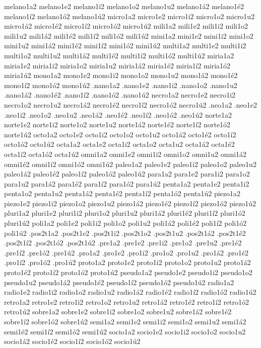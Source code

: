 {melano1a2 melano1e2 melano1i2 melano1o2 melano1u2 melano1á2 melano1é2 melano1í2 melano1ó2 melano1ú2 
micro1a2 micro1e2 micro1i2 micro1o2 micro1u2 micro1á2 micro1é2 micro1í2 micro1ó2 micro1ú2 
mili1a2 mili1e2 mili1i2 mili1o2 mili1u2 mili1á2 mili1é2 mili1í2 mili1ó2 mili1ú2 
mini1a2 mini1e2 mini1i2 mini1o2 mini1u2 mini1á2 mini1é2 mini1í2 mini1ó2 mini1ú2 
multi1a2 multi1e2 multi1i2 multi1o2 multi1u2 multi1á2 multi1é2 multi1í2 multi1ó2 multi1ú2 
miria1a2 miria1e2 miria1i2 miria1o2 miria1u2 miria1á2 miria1é2 miria1í2 miria1ó2 miria1ú2 
mono1a2 mono1e2 mono1i2 mono1o2 mono1u2 mono1á2 mono1é2 mono1í2 mono1ó2 mono1ú2 
.nano1a2 .nano1e2 .nano1i2 .nano1o2 .nano1u2 .nano1á2 .nano1é2 .nano1í2 .nano1ó2 .nano1ú2 
necro1a2 necro1e2 necro1i2 necro1o2 necro1u2 necro1á2 necro1é2 necro1í2 necro1ó2 necro1ú2 
.neo1a2 .neo1e2 .neo1i2 .neo1o2 .neo1u2 .neo1á2 .neo1é2 .neo1í2 .neo1ó2 .neo1ú2 
norte1a2 norte1e2 norte1i2 norte1o2 norte1u2 norte1á2 norte1é2 norte1í2 norte1ó2 norte1ú2 
octo1a2 octo1e2 octo1i2 octo1o2 octo1u2 octo1á2 octo1é2 octo1í2 octo1ó2 octo1ú2 
octa1a2 octa1e2 octa1i2 octa1o2 octa1u2 octa1á2 octa1é2 octa1í2 octa1ó2 octa1ú2 
omni1a2 omni1e2 omni1i2 omni1o2 omni1u2 omni1á2 omni1é2 omni1í2 omni1ó2 omni1ú2 
paleo1a2 paleo1e2 paleo1i2 paleo1o2 paleo1u2 paleo1á2 paleo1é2 paleo1í2 paleo1ó2 paleo1ú2 
para1a2 para1e2 para1i2 para1o2 para1u2 para1á2 para1é2 para1í2 para1ó2 para1ú2 
penta1a2 penta1e2 penta1i2 penta1o2 penta1u2 penta1á2 penta1é2 penta1í2 penta1ó2 penta1ú2 
piezo1a2 piezo1e2 piezo1i2 piezo1o2 piezo1u2 piezo1á2 piezo1é2 piezo1í2 piezo1ó2 piezo1ú2 
pluri1a2 pluri1e2 pluri1i2 pluri1o2 pluri1u2 pluri1á2 pluri1é2 pluri1í2 pluri1ó2 pluri1ú2 
poli1a2 poli1e2 poli1i2 poli1o2 poli1u2 poli1á2 poli1é2 poli1í2 poli1ó2 poli1ú2 
.pos2t1a2 .pos2t1e2 .pos2t1i2 .pos2t1o2 .pos2t1u2 .pos2t1á2 .pos2t1é2 .pos2t1í2 .pos2t1ó2 .pos2t1ú2 
.pre1a2 .pre1e2 .pre1i2 .pre1o2 .pre1u2         .pre1é2 .pre1í2 .pre1ó2 .pre1ú2 
.pro1a2 .pro1e2 .pro1i2 .pro1o2 .pro1u2 .pro1á2 .pro1é2 .pro1í2 .pro1ó2 .pro1ú2 
proto1a2 proto1e2 proto1i2 proto1o2 proto1u2 proto1á2 proto1é2 proto1í2 proto1ó2 proto1ú2 
pseudo1a2 pseudo1e2 pseudo1i2 pseudo1o2 pseudo1u2 pseudo1á2 pseudo1é2 pseudo1í2 pseudo1ó2 pseudo1ú2 
radio1a2 radio1e2 radio1i2 radio1o2 radio1u2 radio1á2 radio1é2 radio1í2 radio1ó2 radio1ú2 
retro1a2 retro1e2 retro1i2 retro1o2 retro1u2 retro1á2 retro1é2 retro1í2 retro1ó2 retro1ú2 
sobre1a2 sobre1e2 sobre1i2 sobre1o2 sobre1u2 sobre1á2 sobre1é2 sobre1í2 sobre1ó2 sobre1ú2 
semi1a2 semi1e2 semi1i2 semi1o2 semi1u2 semi1á2 semi1é2 semi1í2 semi1ó2 semi1ú2 
socio1a2 socio1e2 socio1i2 socio1o2 socio1u2 socio1á2 socio1é2 socio1í2 socio1ó2 socio1ú2 
}
